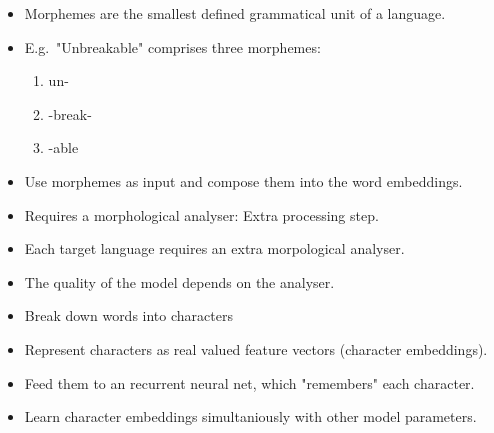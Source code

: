 \documentclass[11pt, a4paper, landscape]{article}
\begin{document}
\NewPage{}

\vfill
\begin{itemize}
\item Morphemes are the smallest defined grammatical unit of a language.
\item E.g.\ "Unbreakable" comprises three morphemes: 
  \begin{enumerate}
    \item un-
    \item -break-
    \item -able
  \end{enumerate}
\item Use morphemes as input and compose them into the word embeddings.
\item Requires a morphological analyser: Extra processing step.
\item Each target language requires an extra morpological analyser.
\item The quality of the model depends on the analyser.
\end{itemize}
\vfill

\NewPage{}

\vfill
\begin{itemize}
  \item Break down words into characters
  \item Represent characters as real valued feature vectors (character embeddings).
  \item Feed them to an recurrent neural net, which "remembers" each character.
  \item Learn character embeddings simultaniously with other model parameters.
\end{itemize}
\vfill
\end{document}
